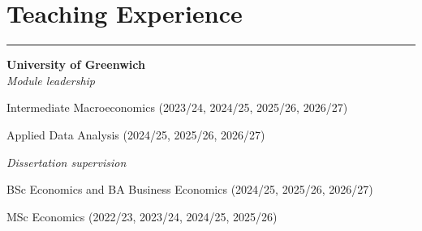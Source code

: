\documentclass[letterpaper]{article}
\renewenvironment{itemize}{
  \begin{list}{}
    { \setlength{\itemsep}{5pt}
      \setlength{\parsep}{0pt}
      \setlength{\topsep}{0pt}
      \setlength{\leftmargin}{0em} } }{
  \end{list}}
\begin{document}
\section*{Teaching Experience}
\hrule
\vspace{2mm}
\textbf{University of Greenwich} \\
\emph{Module leadership}
\begin{itemize}
    \item Intermediate Macroeconomics (2023/24, 2024/25, 2025/26, 2026/27)
    \item Applied Data Analysis (2024/25, 2025/26, 2026/27) 
\end{itemize}
\emph{Dissertation supervision}
\begin{itemize}
    \item BSc Economics and BA Business Economics (2024/25, 2025/26, 2026/27)
    \item MSc Economics (2022/23, 2023/24, 2024/25, 2025/26)
\end{itemize}
\end{document}
